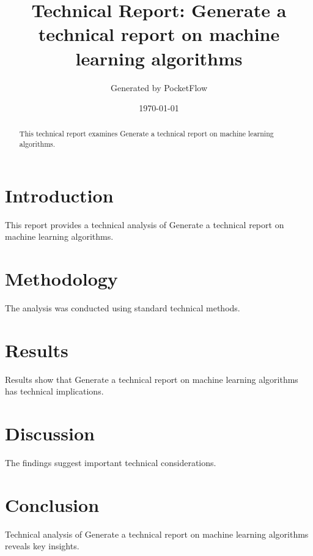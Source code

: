 \documentclass[11pt,a4paper]{article}
\begin{document}
\title{Technical Report: Generate a technical report on machine learning algorithms}
\author{Generated by PocketFlow}
\date{\today}

\maketitle

\begin{abstract}
This technical report examines Generate a technical report on machine learning algorithms.
\end{abstract}

\tableofcontents
\newpage

\section{Introduction}
This report provides a technical analysis of Generate a technical report on machine learning algorithms.

\section{Methodology}
The analysis was conducted using standard technical methods.

\section{Results}
Results show that Generate a technical report on machine learning algorithms has technical implications.

\section{Discussion}
The findings suggest important technical considerations.

\section{Conclusion}
Technical analysis of Generate a technical report on machine learning algorithms reveals key insights.
\end{document}
